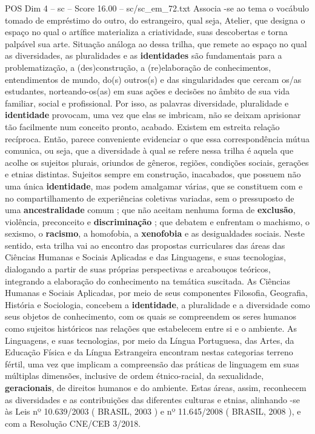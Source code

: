 \begin{textsample}{POS Dim 4 – sc – Score 16.00 – sc/sc\_em\_72.txt}
Associa -se ao tema o vocábulo tomado de empréstimo do outro, do estrangeiro, qual seja, Atelier, que designa o espaço no qual o artífice materializa a criatividade, suas descobertas e torna palpável sua arte.
Situação análoga ao dessa trilha, que remete ao espaço no qual as diversidades, as pluralidades e as \textbf{identidades} são fundamentais para a problematização, a (des)construção, a (re)elaboração de conhecimentos, entendimentos de mundo, do(s) outros(s) e das singularidades que cercam os/as estudantes, norteando-os(as) em suas ações e decisões no âmbito de sua vida familiar, social e profissional.
Por isso, as palavras diversidade, pluralidade e \textbf{identidade} provocam, uma vez que elas se imbricam, não se deixam aprisionar tão facilmente num conceito pronto, acabado.
Existem em estreita relação recíproca.
Então, parece conveniente evidenciar o que essa correspondência mútua comunica, ou seja, que a diversidade à qual se refere nessa trilha é aquela que acolhe os sujeitos plurais, oriundos de gêneros, regiões, condições sociais, gerações e etnias distintas.
Sujeitos sempre em construção, inacabados, que possuem não uma única \textbf{identidade}, mas podem amalgamar várias, que se constituem com e no compartilhamento de experiências coletivas variadas, sem o pressuposto de uma \textbf{ancestralidade} comum ; que não aceitam nenhuma forma de \textbf{exclusão}, violência, preconceito e \textbf{discriminação} ; que debatem e enfrentam o machismo, o sexismo, o \textbf{racismo}, a homofobia, a \textbf{xenofobia} e as desigualdades sociais.
Neste sentido, esta trilha vai ao encontro das propostas curriculares das áreas das Ciências Humanas e Sociais Aplicadas e das Linguagens, e suas tecnologias, dialogando a partir de suas próprias perspectivas e arcabouços teóricos, integrando a elaboração do conhecimento na temática suscitada.
As Ciências Humanas e Sociais Aplicadas, por meio de seus componentes Filosofia, Geografia, História e Sociologia, concebem a \textbf{identidade}, a pluralidade e a diversidade como seus objetos de conhecimento, com os quais se compreendem os seres humanos como sujeitos históricos nas relações que estabelecem entre si e o ambiente.
As Linguagens, e suas tecnologias, por meio da Língua Portuguesa, das Artes, da Educação Física e da Língua Estrangeira encontram nestas categorias terreno fértil, uma vez que implicam a compreensão das práticas de linguagem em suas múltiplas dimensões, inclusive de ordem étnico-racial, da sexualidade, \textbf{geracionais}, de direitos humanos e do ambiente.
Estas áreas, assim, reconhecem as diversidades e as contribuições das diferentes culturas e etnias, alinhando -se às Leis nº 10.639/2003 ( BRASIL, 2003 ) e nº 11.645/2008 ( BRASIL, 2008 ), e com a Resolução CNE/CEB 3/2018.

\end{textsample}
